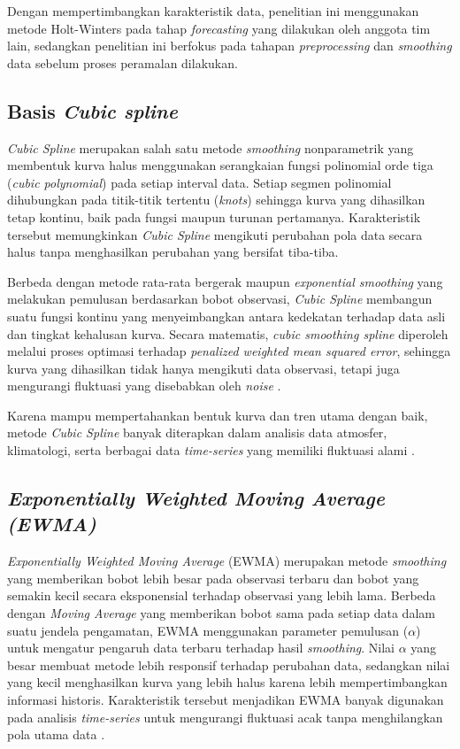 Dengan mempertimbangkan karakteristik data, penelitian ini menggunakan metode Holt-Winters pada tahap \textit{forecasting} yang dilakukan oleh anggota tim lain, sedangkan penelitian ini berfokus pada tahapan \textit{preprocessing} dan \textit{smoothing} data sebelum proses peramalan dilakukan.
\subsection{Basis \textit{Cubic spline}}
\textit{Cubic Spline} merupakan salah satu metode \textit{smoothing} nonparametrik yang membentuk kurva halus menggunakan serangkaian fungsi polinomial orde tiga (\textit{cubic polynomial}) pada setiap interval data. Setiap segmen polinomial dihubungkan pada titik-titik tertentu (\textit{knots}) sehingga kurva yang dihasilkan tetap kontinu, baik pada fungsi maupun turunan pertamanya. Karakteristik tersebut memungkinkan \textit{Cubic Spline} mengikuti perubahan pola data secara halus tanpa menghasilkan perubahan yang bersifat tiba-tiba.

Berbeda dengan metode rata-rata bergerak maupun \textit{exponential smoothing} yang melakukan pemulusan berdasarkan bobot observasi, \textit{Cubic Spline} membangun suatu fungsi kontinu yang menyeimbangkan antara kedekatan terhadap data asli dan tingkat kehalusan kurva. Secara matematis, \textit{cubic smoothing spline} diperoleh melalui proses optimasi terhadap \textit{penalized weighted mean squared error}, sehingga kurva yang dihasilkan tidak hanya mengikuti data observasi, tetapi juga mengurangi fluktuasi yang disebabkan oleh \textit{noise} \citep{degiosa2024}.

Karena mampu mempertahankan bentuk kurva dan tren utama dengan baik, metode \textit{Cubic Spline} banyak diterapkan dalam analisis data atmosfer, klimatologi, serta berbagai data \textit{time-series} yang memiliki fluktuasi alami \citep{wust2017}.

\subsection{\textit{Exponentially Weighted Moving Average (EWMA)}}

\textit{Exponentially Weighted Moving Average} (EWMA) merupakan metode \textit{smoothing} yang memberikan bobot lebih besar pada observasi terbaru dan bobot yang semakin kecil secara eksponensial terhadap observasi yang lebih lama. Berbeda dengan \textit{Moving Average} yang memberikan bobot sama pada setiap data dalam suatu jendela pengamatan, EWMA menggunakan parameter pemulusan ($\alpha$) untuk mengatur pengaruh data terbaru terhadap hasil \textit{smoothing}. Nilai $\alpha$ yang besar membuat metode lebih responsif terhadap perubahan data, sedangkan nilai yang kecil menghasilkan kurva yang lebih halus karena lebih mempertimbangkan informasi historis. Karakteristik tersebut menjadikan EWMA banyak digunakan pada analisis \textit{time-series} untuk mengurangi fluktuasi acak tanpa menghilangkan pola utama data \citep{javed2024}.

